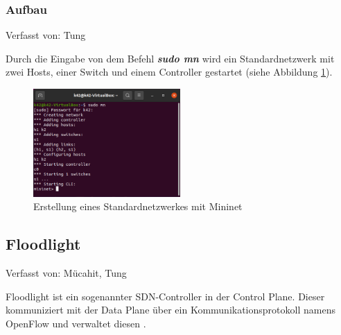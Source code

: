 \documentclass[fontsize=12pt,paper=a4,open=any,parskip=half,
  twoside=false,toc=listof,toc=bibliography,fleqn,leqno,
  captions=nooneline,captions=tableabove,british]{scrbook}
\begin{document}
\subsubsection{Aufbau}
{\tiny Verfasst von: Tung\par}
Durch die Eingabe von dem Befehl \textit{\textbf{sudo mn}} wird ein Standardnetzwerk mit zwei Hosts, einer Switch und einem Controller gestartet (siehe Abbildung \ref{sudomn}).

\begin{figure}[H]
 \centering
 \includegraphics[width=0.5\textwidth]{Bilder/sudomn}
 \captionsetup{justification=centering,margin=2cm}
 \caption{Erstellung eines Standardnetzwerkes mit Mininet}
 \label{sudomn}
\end{figure}

\subsection{Floodlight}
{\tiny Verfasst von: Mücahit, Tung\par}
Floodlight ist ein sogenannter SDN-Controller in der Control Plane. Dieser kommuniziert mit der Data Plane über ein Kommunikationsprotokoll namens OpenFlow und verwaltet diesen \cite[161]{floodlightdefinition}.
\end{document}
